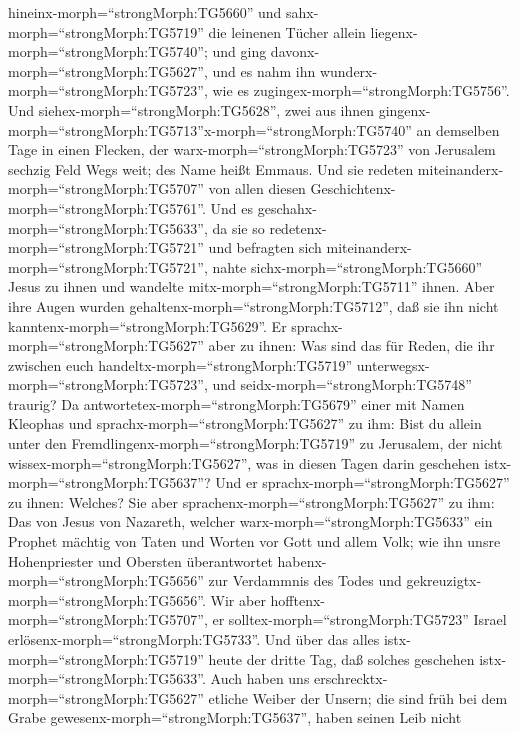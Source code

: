 hineinx-morph=``strongMorph:TG5660'' und
sahx-morph=``strongMorph:TG5719'' die leinenen Tücher allein
liegenx-morph=``strongMorph:TG5740''; und ging
davonx-morph=``strongMorph:TG5627'', und es nahm ihn
wunderx-morph=``strongMorph:TG5723'', wie es
zugingex-morph=``strongMorph:TG5756''.  Und
siehex-morph=``strongMorph:TG5628'', zwei aus ihnen
gingenx-morph=``strongMorph:TG5713''x-morph=``strongMorph:TG5740'' an
demselben Tage in einen Flecken, der warx-morph=``strongMorph:TG5723''
von Jerusalem sechzig Feld Wegs weit; des Name heißt Emmaus.
 Und sie redeten miteinanderx-morph=``strongMorph:TG5707''
von allen diesen Geschichtenx-morph=``strongMorph:TG5761''.
 Und es geschahx-morph=``strongMorph:TG5633'', da sie so
redetenx-morph=``strongMorph:TG5721'' und befragten sich
miteinanderx-morph=``strongMorph:TG5721'', nahte
sichx-morph=``strongMorph:TG5660'' Jesus zu ihnen und wandelte
mitx-morph=``strongMorph:TG5711'' ihnen.  Aber ihre Augen
wurden gehaltenx-morph=``strongMorph:TG5712'', daß sie ihn nicht
kanntenx-morph=``strongMorph:TG5629''.  Er
sprachx-morph=``strongMorph:TG5627'' aber zu ihnen: Was sind das für
Reden, die ihr zwischen euch handeltx-morph=``strongMorph:TG5719''
unterwegsx-morph=``strongMorph:TG5723'', und
seidx-morph=``strongMorph:TG5748'' traurig?  Da
antwortetex-morph=``strongMorph:TG5679'' einer mit Namen Kleophas und
sprachx-morph=``strongMorph:TG5627'' zu ihm: Bist du allein unter den
Fremdlingenx-morph=``strongMorph:TG5719'' zu Jerusalem, der nicht
wissex-morph=``strongMorph:TG5627'', was in diesen Tagen darin geschehen
istx-morph=``strongMorph:TG5637''?  Und er
sprachx-morph=``strongMorph:TG5627'' zu ihnen: Welches? Sie aber
sprachenx-morph=``strongMorph:TG5627'' zu ihm: Das von Jesus von
Nazareth, welcher warx-morph=``strongMorph:TG5633'' ein Prophet mächtig
von Taten und Worten vor Gott und allem Volk;  wie ihn
unsre Hohenpriester und Obersten überantwortet
habenx-morph=``strongMorph:TG5656'' zur Verdammnis des Todes und
gekreuzigtx-morph=``strongMorph:TG5656''.  Wir aber
hofftenx-morph=``strongMorph:TG5707'', er
solltex-morph=``strongMorph:TG5723'' Israel
erlösenx-morph=``strongMorph:TG5733''. Und über das alles
istx-morph=``strongMorph:TG5719'' heute der dritte Tag, daß solches
geschehen istx-morph=``strongMorph:TG5633''.  Auch haben
uns erschrecktx-morph=``strongMorph:TG5627'' etliche Weiber der Unsern;
die sind früh bei dem Grabe gewesenx-morph=``strongMorph:TG5637'',
 haben seinen Leib nicht

